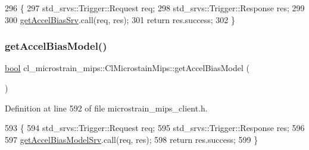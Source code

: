 \begin{DoxyCode}
296     \{
297         std\_srvs::Trigger::Request req;
298         std\_srvs::Trigger::Response res;
299 
300         \hyperlink{classcl__microstrain__mips_1_1ClMicrostainMips_a79547e77f9122ca67610f153657ec8ac}{getAccelBiasSrv}.call(req, res);
301         \textcolor{keywordflow}{return} res.success;
302     \}
\end{DoxyCode}
\mbox{\label{classcl__microstrain__mips_1_1ClMicrostainMips_a8765bf73916e6de2646aba55f3b8a5ce}} 
\subsubsection{\texorpdfstring{get\+Accel\+Bias\+Model()}{getAccelBiasModel()}}
{\footnotesize\ttfamily \hyperlink{classbool}{bool} cl\+\_\+microstrain\+\_\+mips\+::\+Cl\+Microstain\+Mips\+::get\+Accel\+Bias\+Model (\begin{DoxyParamCaption}{ }\end{DoxyParamCaption})\hspace{0.3cm}{\ttfamily [inline]}}



Definition at line 592 of file microstrain\+\_\+mips\+\_\+client.\+h.


\begin{DoxyCode}
593     \{
594         std\_srvs::Trigger::Request req;
595         std\_srvs::Trigger::Response res;
596 
597         \hyperlink{classcl__microstrain__mips_1_1ClMicrostainMips_a5516ee2ad71621f728245d0854104dc7}{getAccelBiasModelSrv}.call(req, res);
598         \textcolor{keywordflow}{return} res.success;
599     \}
\end{DoxyCode}
\mbox{\label{classcl__microstrain__mips_1_1ClMicrostainMips_a6b75108e49aca71fdff9ac7fd83aecc0}} 
